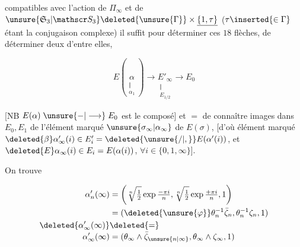 
compatibles avec l'action de $\Pi_\infty$ et de $\unsure{\mathfrak S_3|\mathscr S_3}\deleted{\unsure{\Gamma}}\times\underline{\{1,\tau\}}$ ($\tau\inserted{\in\Gamma}$ étant la conjugaison complexe) il suffit pour déterminer ces $18$ flèches, de déterminer deux d'entre elles,  

\[
E(\underset{\substack{\Vert\\\alpha_1}}{\alpha})\longrightarrow
\underset{\substack{\Vert\\E_{1/2}}}{E'_\infty}\longrightarrow E_0
\]

[NB $E(\alpha)\mathrel{\unsure{-|\longrightarrow}}E_0$ est le composé] et $=$ de connaître  images dans $E_0,E_1$ de l'élément marqué $\unsure{\sigma_\infty|\alpha_\infty}$ de $E(\sigma)$, [d'où élément marqué $\deleted{\beta}\alpha'_\infty(i)\in E'_i=\deleted{\unsure{/|,}}E(\alpha'(i))$, et $\deleted{E}\alpha_\infty(i)\in E_i=E(\alpha(i))$, $\forall i\in\{0,1,\infty\}$].

On trouve

\[
\begin{aligned}
\alpha'_n(\infty)&=\left(\sqrt[n]{\tfrac12}\exp\tfrac{-\pi i}{n},\sqrt[n]{\tfrac12}\exp\tfrac{+\pi i}{n},1\right)\\
&=(\deleted{\unsure{\varphi}}\theta_n^{-1}\bar\zeta_n,\theta_n^{-1}\zeta_n,1)\\
\deleted{\alpha'_\infty(\infty)}&\deleted{=}\\[-.6ex]
\alpha'_\infty(\infty)&=(\theta_\infty\wedge\bar\zeta_{\unsure{n|\infty}},\theta_\infty\wedge\zeta_\infty,1)
\end{aligned}
\]

